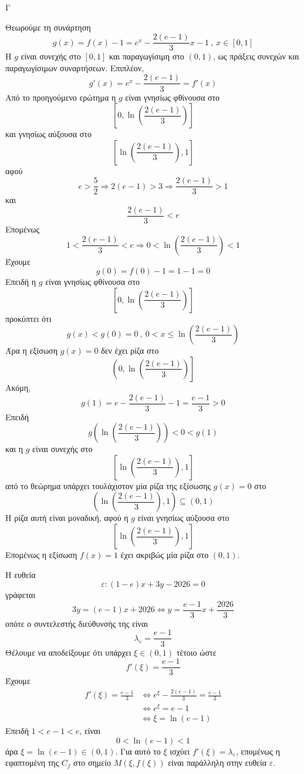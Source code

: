 \begin{thema}{Γ}
\begin{erwthma}
\item Θεωρούμε τη συνάρτηση
\[g(x)=f(x)-1=e^x-\frac{2(e-1)}{3}x-1\ ,\ x\in[0,1]\]
Η $g$ είναι συνεχής στο $[0,1]$ και παραγωγίσιμη στο $(0,1)$, ως πράξεις συνεχών και παραγωγίσιμων συναρτήσεων.
Επιπλέον,
\[g'(x)=e^x-\frac{2(e-1)}{3}=f'(x)\]
Από το προηγούμενο ερώτημα η $g$ είναι γνησίως φθίνουσα στο
\[\left[0,\ln\left(\frac{2(e-1)}{3}\right)\right]\]
και γνησίως αύξουσα στο
\[\left[\ln\left(\frac{2(e-1)}{3}\right),1\right]\]
αφού
\[e>\frac{5}{2}\Rightarrow 2(e-1)>3\Rightarrow \frac{2(e-1)}{3}>1\]
και
\[\frac{2(e-1)}{3}<e\]
Επομένως
\[1<\frac{2(e-1)}{3}<e \Rightarrow 0<\ln\left(\frac{2(e-1)}{3}\right)<1\]
Έχουμε
\[g(0)=f(0)-1=1-1=0\]
Επειδή η $g$ είναι γνησίως φθίνουσα στο
\[\left[0,\ln\left(\frac{2(e-1)}{3}\right)\right]\]
προκύπτει ότι
\[g(x)<g(0)=0\ ,\ 0<x\leq \ln\left(\frac{2(e-1)}{3}\right)\]
Άρα η εξίσωση $g(x)=0$ δεν έχει ρίζα στο
\[\left(0,\ln\left(\frac{2(e-1)}{3}\right)\right]\]
Ακόμη,
\[g(1)=e-\frac{2(e-1)}{3}-1=\frac{e-1}{3}>0\]
Επειδή
\[g\left(\ln\left(\frac{2(e-1)}{3}\right)\right)<0<g(1)\]
και η $g$ είναι συνεχής στο
\[\left[\ln\left(\frac{2(e-1)}{3}\right),1\right]\]
από το θεώρημα  υπάρχει τουλάχιστον μία ρίζα της εξίσωσης $g(x)=0$ στο
\[\left(\ln\left(\frac{2(e-1)}{3}\right),1\right)\subseteq(0,1)\]
Η ρίζα αυτή είναι μοναδική, αφού η $g$ είναι γνησίως αύξουσα στο
\[\left[\ln\left(\frac{2(e-1)}{3}\right),1\right]\]
Επομένως η εξίσωση $f(x)=1$ έχει ακριβώς μία ρίζα στο $(0,1)$.

\item Η ευθεία
\[\varepsilon:(1-e)x+3y-2026=0\]
γράφεται
\[3y=(e-1)x+2026 \Leftrightarrow y=\frac{e-1}{3}x+\frac{2026}{3}\]
οπότε ο συντελεστής διεύθυνσής της είναι
\[\lambda_{\varepsilon}=\frac{e-1}{3}\]
Θέλουμε να αποδείξουμε ότι υπάρχει $\xi\in(0,1)$ τέτοιο ώστε
\[f'(\xi)=\frac{e-1}{3}\]
Έχουμε
\begin{align*}
f'(\xi)=\frac{e-1}{3}
&\Leftrightarrow e^\xi-\frac{2(e-1)}{3}=\frac{e-1}{3}\\
&\Leftrightarrow e^\xi=e-1\\
&\Leftrightarrow \xi=\ln(e-1)
\end{align*}
Επειδή $1<e-1<e$, είναι
\[0<\ln(e-1)<1\]
άρα $\xi=\ln(e-1)\in(0,1)$.
Για αυτό το $\xi$ ισχύει $f'(\xi)=\lambda_{\varepsilon}$, επομένως η εφαπτομένη της $C_f$ στο σημείο $M(\xi,f(\xi))$ είναι παράλληλη στην ευθεία $\varepsilon$.
\end{erwthma}
\end{thema}


